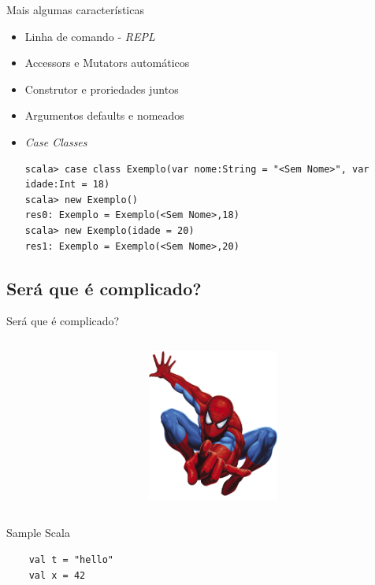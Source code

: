 \documentclass{beamer}
\begin{document}
\begin{frame}[fragile]{Mais algumas características} 
    \begin{itemize} %
        \item Linha de comando - \emph{REPL}
        \item Accessors e Mutators automáticos
        \item Construtor e proriedades juntos
        \item Argumentos defaults e nomeados
        \item \emph{Case Classes}
\begin{lstlisting}
scala> case class Exemplo(var nome:String = "<Sem Nome>", var idade:Int = 18)
scala> new Exemplo()
res0: Exemplo = Exemplo(<Sem Nome>,18)
scala> new Exemplo(idade = 20)
res1: Exemplo = Exemplo(<Sem Nome>,20)
\end{lstlisting}
    \end{itemize}
\end{frame}

\subsection{Será que é complicado?}

\begin{frame}{Será que é complicado?}
	\begin{columns}
           \begin{column}{.5\textwidth}               
           \end{column}
           \begin{column}{.5\textwidth}
               \includegraphics[height=5cm]{spiderman.png}
           \end{column}
	\end{columns}

\end{frame}
 
\begin{frame}[fragile] {Sample Scala}

    \begin{lstlisting}
    val t = "hello" 
    val x = 42 
    \end{lstlisting}

\end{frame}
\end{document}

